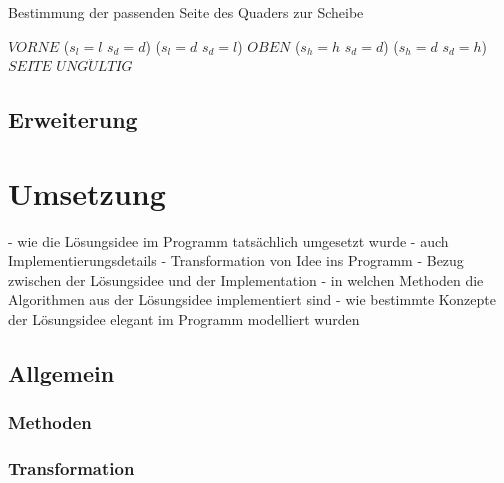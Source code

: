 \documentclass[a4paper,10pt,ngerman]{scrartcl}
\begin{document}
    \begin{algorithm}[H]
        \caption{Bestimmung der passenden Seite des Quaders zur Scheibe}
        \label{alg:cheese2}
        \begin{algorithmic}
                    \State \Return $VORNE$
                \ElsIf
                        {($s_{l} = l$ \land $s_{d} = d$) \lor ($s_{l} = d$ \land $s_{d} = l$)}
                    \State \Return $OBEN$
                \ElsIf
                        {($s_{h} = h$ \land $s_{d} = d$) \lor ($s_{h} = d$ \land $s_{d} = h$)}
                    \State \Return $SEITE$
                \Else
                    \State \Return $UNG\ddot ULTIG$
                \EndIf
            \EndFunction
        \end{algorithmic}
    \end{algorithm}

    \subsection{Erweiterung}\label{subsec:erweiterung_losungsidee}

    \newpage


    \section{Umsetzung}\label{sec:umsetzung}

    - wie die Lösungsidee im Programm tatsächlich umgesetzt wurde
    - auch Implementierungsdetails
    - Transformation von Idee ins Programm
    - Bezug zwischen der Lösungsidee und der Implementation
    - in welchen Methoden die Algorithmen aus der Lösungsidee implementiert sind
    - wie bestimmte Konzepte der Lösungsidee elegant im Programm modelliert wurden

    \subsection{Allgemein}\label{subsec:allgemein2}

    \subsubsection{Methoden}\label{subsubsec:methoden}
    \subsubsection{Transformation}\label{subsubsec:transformation}
\end{document}
